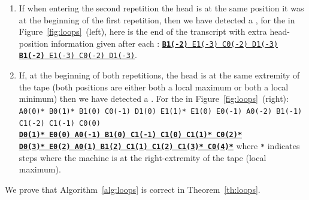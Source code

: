 \begin{enumerate}
    \item If when entering the second repetition the head is at the same position it was at the beginning of the first repetition, then we have detected a \cycler, \eg for the \cycler in Figure~\ref{fig:loops}~(left), here is the end of the transcript with extra head-position information given after each \ssp: \texttt{\underline{\textbf{B1(-2)} E1(-3) C0(-2) D1(-3)} \underline{\textbf{B1(-2)} E1(-3) C0(-2) D1(-3)}}.

    \item If, at the beginning of both repetitions, the head is at the same extremity of the tape (\ie both positions are either both a local maximum or both a local minimum) then we have detected a \TC. For the \TC in Figure~\ref{fig:loops}~(right):  \texttt{A0(0)* B0(1)* B1(0) C0(-1) D1(0) E1(1)* E1(0) E0(-1) A0(-2) B1(-1) C1(-2) C1(-1) C0(0) \\  \underline{\textbf{D0(1)* E0(0) A0(-1) B1(0) C1(-1) C1(0) C1(1)* C0(2)*}} \\ \underline{\textbf{D0(3)* E0(2) A0(1) B1(2) C1(1) C1(2) C1(3)* C0(4)*}}} where \texttt{*} indicates steps where the machine is at the right-extremity of the tape (\headpos local maximum).


\end{enumerate}

We prove that Algorithm~\ref{alg:loops} is correct in Theorem~\ref{th:loops}.




